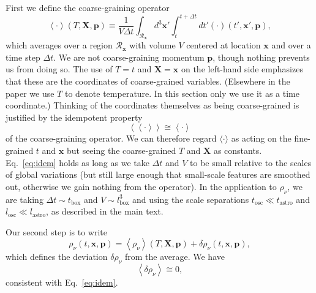 \documentclass[aps,prd,twocolumn,groupedaddress]{revtex4-2}
\begin{document}
First we define the coarse-graining operator 
\begin{equation}
\left\langle \cdot \right\rangle (T, \boldsymbol{X}, \boldsymbol{p}) \equiv \frac{1}{V \Delta t} \int_{\mathcal{R}_{\boldsymbol{x}}} d^3\boldsymbol{x}' \int_t^{t+\Delta t} dt' \left( \cdot \right) \left( t', \boldsymbol{x}', \boldsymbol{p} \right), \label{eq:cgop}
\end{equation}
which averages over a region $\mathcal{R}_{\boldsymbol{x}}$ with volume $V$ centered at location $\boldsymbol{x}$ and over a time step $\Delta t$. We are not coarse-graining momentum $\boldsymbol{p}$, though nothing prevents us from doing so. The use of $T = t$ and $\boldsymbol{X} = \boldsymbol{x}$ on the left-hand side emphasizes that these are the coordinates of coarse-grained variables. (Elsewhere in the paper we use $T$ to denote temperature. In this section only we use it as a time coordinate.) Thinking of the coordinates themselves as being coarse-grained is justified by the idempotent property
\begin{equation}
\left\langle \left\langle \cdot \right\rangle \right\rangle \cong \left\langle \cdot \right\rangle \label{eq:idem}
\end{equation}
of the coarse-graining operator. We can therefore regard $\langle \cdot \rangle$ as acting on the fine-grained $t$ and $\boldsymbol{x}$ but seeing the coarse-grained $T$ and $\boldsymbol{X}$ as constants. Eq.~\eqref{eq:idem} holds as long as we take $\Delta t$ and $V$ to be small relative to the scales of global variations (but still large enough that small-scale features are smoothed out, otherwise we gain nothing from the operator). In the application to $\rho_\nu$, we are taking $\Delta t \sim t_\textrm{box}$ and $V \sim l_\textrm{box}^3$ and using the scale separations $t_\textrm{osc} \ll t_\textrm{astro}$ and $l_\textrm{osc} \ll l_\textrm{astro}$, as described in the main text.

Our second step is to write
\begin{equation}
\rho_\nu (t, \boldsymbol{x}, \boldsymbol{p}) = \left\langle \rho_\nu \right\rangle (T, \boldsymbol{X}, \boldsymbol{p})  + \delta \rho_\nu (t, \boldsymbol{x}, \boldsymbol{p}), \label{eq:miscexpand}
\end{equation}
which defines the deviation $\delta \rho_\nu$ from the average. We have
\begin{equation}
\left\langle \delta \rho_\nu \right\rangle \cong 0, \label{eq:miscavgdelta}
\end{equation}
consistent with Eq.~\eqref{eq:idem}.
\end{document}
